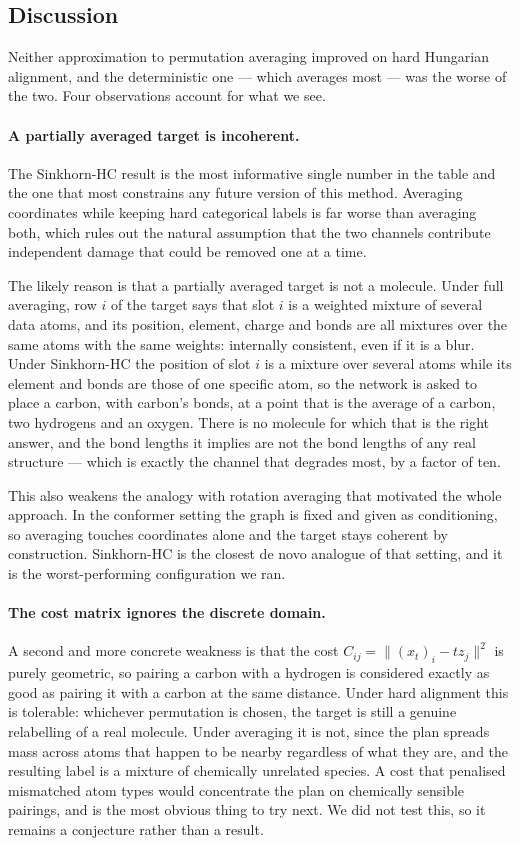 \subsection{Discussion}

Neither approximation to permutation averaging improved on hard Hungarian alignment, and the
deterministic one --- which averages most --- was the worse of the two. Four observations account
for what we see.

\paragraph{A partially averaged target is incoherent.}
The Sinkhorn-HC result is the most informative single number in the table and the one that most
constrains any future version of this method. Averaging coordinates while keeping hard categorical
labels is far worse than averaging both, which rules out the natural assumption that the two
channels contribute independent damage that could be removed one at a time.

The likely reason is that a partially averaged target is not a molecule. Under full averaging,
row $i$ of the target says that slot $i$ is a weighted mixture of several data atoms, and its
position, element, charge and bonds are all mixtures over the same atoms with the same weights:
internally consistent, even if it is a blur. Under Sinkhorn-HC the position of slot $i$ is a mixture
over several atoms while its element and bonds are those of one specific atom, so the network is
asked to place a carbon, with carbon's bonds, at a point that is the average of a carbon, two
hydrogens and an oxygen. There is no molecule for which that is the right answer, and the bond
lengths it implies are not the bond lengths of any real structure --- which is exactly the channel
that degrades most, by a factor of ten.

This also weakens the analogy with rotation averaging that motivated the whole approach. In the
conformer setting the graph is fixed and given as conditioning, so averaging touches coordinates
alone and the target stays coherent by construction. Sinkhorn-HC is the closest de novo analogue of
that setting, and it is the worst-performing configuration we ran.

\paragraph{The cost matrix ignores the discrete domain.}
A second and more concrete weakness is that the cost $C_{ij} = \|(x_t)_i - t z_j\|^2$ is purely
geometric, so pairing a carbon with a hydrogen is considered exactly as good as pairing it with a
carbon at the same distance. Under hard alignment this is tolerable: whichever permutation is
chosen, the target is still a genuine relabelling of a real molecule. Under averaging it is not,
since the plan spreads mass across atoms that happen to be nearby regardless of what they are, and
the resulting label is a mixture of chemically unrelated species. A cost that penalised mismatched
atom types would concentrate the plan on chemically sensible pairings, and is the most obvious thing
to try next. We did not test this, so it remains a conjecture rather than a result.

